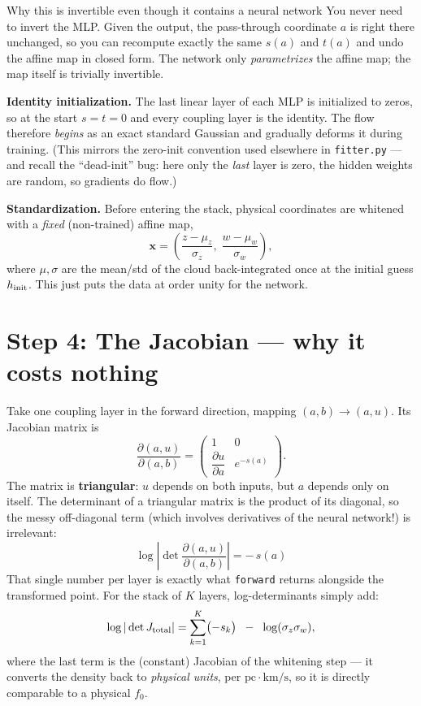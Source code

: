 \documentclass[11pt]{article}
\begin{document}
\begin{keybox}{Why this is invertible even though it contains a neural network}
You never need to invert the MLP. Given the output, the pass-through coordinate $a$
is right there unchanged, so you can recompute exactly the same $s(a)$ and $t(a)$ and
undo the affine map in closed form. The network only \emph{parametrizes} the affine
map; the map itself is trivially invertible.
\end{keybox}

\textbf{Identity initialization.} The last linear layer of each MLP is initialized to
zeros, so at the start $s=t=0$ and every coupling layer is the identity. The flow
therefore \emph{begins} as an exact standard Gaussian and gradually deforms it during
training. (This mirrors the zero-init convention used elsewhere in \texttt{fitter.py}
--- and recall the ``dead-init'' bug: here only the \emph{last} layer is zero, the
hidden weights are random, so gradients do flow.)

\textbf{Standardization.} Before entering the stack, physical coordinates are
whitened with a \emph{fixed} (non-trained) affine map,
\[
\bm x = \left(\frac{z-\mu_z}{\sigma_z},\; \frac{w-\mu_w}{\sigma_w}\right),
\]
where $\mu,\sigma$ are the mean/std of the cloud back-integrated once at the initial
guess $h_{\rm init}$. This just puts the data at order unity for the network.

\section{Step 4: The Jacobian --- why it costs nothing}

Take one coupling layer in the forward direction, mapping $(a,b) \to (a,u)$.
Its Jacobian matrix is
\[
\frac{\partial(a,u)}{\partial(a,b)} =
\begin{pmatrix}
1 & 0 \\[4pt]
\dfrac{\partial u}{\partial a} & e^{-s(a)}
\end{pmatrix}.
\]
The matrix is \textbf{triangular}: $u$ depends on both inputs, but $a$ depends only on
itself. The determinant of a triangular matrix is the product of its diagonal, so the
messy off-diagonal term (which involves derivatives of the neural network!) is
irrelevant:
\begin{equation}
\boxed{\;\log\left|\det \frac{\partial(a,u)}{\partial(a,b)}\right| = -\,s(a)\;}
\end{equation}
That single number per layer is exactly what \texttt{forward} returns alongside the
transformed point. For the stack of $K$ layers, log-determinants simply add:
\[
\log|\det J_{\rm total}| = \sum_{k=1}^{K} \bigl(-s_k\bigr)
\;\;-\;\; \log(\sigma_z \sigma_w),
\]
where the last term is the (constant) Jacobian of the whitening step --- it converts
the density back to \emph{physical units}, per $\mathrm{pc}\cdot\mathrm{km/s}$, so it
is directly comparable to a physical $f_0$.
\end{document}
